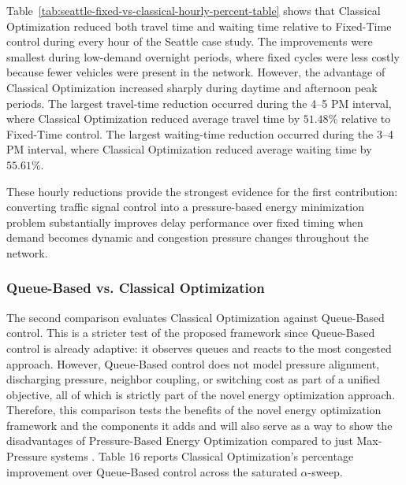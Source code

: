 \documentclass[12pt]{article}
\begin{document}
Table~\ref{tab:seattle-fixed-vs-classical-hourly-percent-table} shows that Classical Optimization reduced both travel time and waiting time relative to Fixed-Time control during every hour of the Seattle case study. The improvements were smallest during low-demand overnight periods, where fixed cycles were less costly because fewer vehicles were present in the network. However, the advantage of Classical Optimization increased sharply during daytime and afternoon peak periods. The largest travel-time reduction occurred during the 4–5 PM interval, where Classical Optimization reduced average travel time by $51.48\%$ relative to Fixed-Time control. The largest waiting-time reduction occurred during the 3–4 PM interval, where Classical Optimization reduced average waiting time by $55.61\%$.

These hourly reductions provide the strongest evidence for the first contribution: converting traffic signal control into a pressure-based energy minimization problem substantially improves delay performance over fixed timing when demand becomes dynamic and congestion pressure changes throughout the network.

\subsubsection{Queue-Based vs. Classical Optimization}

The second comparison evaluates Classical Optimization against Queue-Based control. This is a stricter test of the proposed framework since Queue-Based control is already adaptive: it observes queues and reacts to the most congested approach. However, Queue-Based control does not model pressure alignment, discharging pressure, neighbor coupling, or switching cost as part of a unified objective, all of which is strictly part of the novel energy optimization approach. Therefore, this comparison tests the benefits of the novel energy optimization framework and the components it adds and will also serve as a way to show the disadvantages of Pressure-Based Energy Optimization compared to just Max-Pressure systems \cite{varaiya2013}. Table 16 reports Classical Optimization’s percentage improvement over Queue-Based control across the saturated $\alpha$-sweep.
\end{document}
